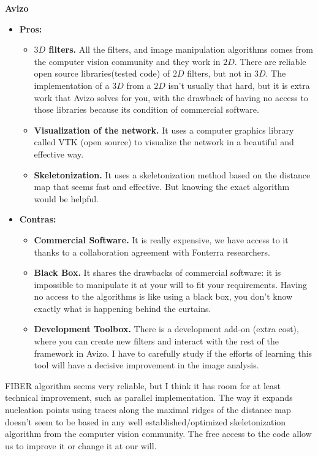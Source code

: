 {\large\textbf{Avizo}}
\begin{itemize}
  \item \textbf{Pros:}


\begin{itemize}
  \item \textbf{$3D$ filters.} All the filters, and image manipulation
  algorithms comes from the computer vision community and they work in $2D$.
  There are reliable open source libraries(tested code) of $2D$ filters, but
  not in $3D$.
  The implementation of a $3D$ from a $2D$ isn't usually that hard, but it is
  extra work that Avizo solves for you, with the drawback of having no access to
  those libraries because its condition of commercial software.
   \item \textbf{Visualization of the network.} It uses a computer graphics
   library called VTK (open source) to visualize the network in a beautiful and
   effective way.
   \item \textbf{Skeletonization.} It uses a skeletonization method based on the
   distance map that seems fast and effective. But knowing the exact algorithm
   would be helpful.
\end{itemize}
\item \textbf{Contras:}
\begin{itemize}
  \item \textbf{Commercial Software.} It is really expensive, we have access to
  it thanks to a collaboration agreement with Fonterra researchers. 
  \item \textbf{Black Box.} It
  shares the drawbacks of commercial software: it is impossible to
  manipulate it at your will to fit your requirements. Having no access to the
  algorithms is like using a black box, you don't know exactly what is
  happening behind the curtains. 
  \item \textbf{Development Toolbox.} There is a development add-on (extra
  cost), where you can create new filters and interact with the rest of the framework
  in Avizo. I have to carefully study if the efforts of learning this tool will
  have a decisive improvement in the image analysis.
\end{itemize}
\end{itemize}
FIBER algorithm seems very reliable, but I think it has
room for at least technical improvement, such as parallel implementation.
The way it expands nucleation points using traces along the maximal ridges
of the distance map doesn't seem to be based in any well
established/optimized skeletonization algorithm from the computer vision
community. The free access to the code allow us to improve it or change it at our will.

